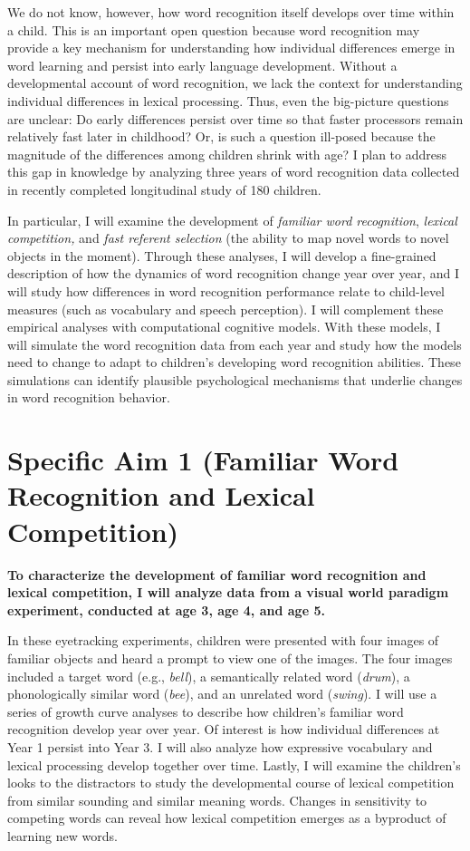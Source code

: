 \documentclass[]{book}
\theoremstyle{definition}
\theoremstyle{definition}
\theoremstyle{remark}
\begin{document}
We do not know, however, how word recognition itself develops over time
within a child. This is an important open question because word
recognition may provide a key mechanism for understanding how individual
differences emerge in word learning and persist into early language
development. Without a developmental account of word recognition, we
lack the context for understanding individual differences in lexical
processing. Thus, even the big-picture questions are unclear: Do early
differences persist over time so that faster processors remain
relatively fast later in childhood? Or, is such a question ill-posed
because the magnitude of the differences among children shrink with age?
I plan to address this gap in knowledge by analyzing three years of word
recognition data collected in recently completed longitudinal study of
180 children.

In particular, I will examine the development of \emph{familiar word
recognition}, \emph{lexical competition,} and \emph{fast referent
selection} (the ability to map novel words to novel objects in the
moment). Through these analyses, I will develop a fine-grained
description of how the dynamics of word recognition change year over
year, and I will study how differences in word recognition performance
relate to child-level measures (such as vocabulary and speech
perception). I will complement these empirical analyses with
computational cognitive models. With these models, I will simulate the
word recognition data from each year and study how the models need to
change to adapt to children's developing word recognition abilities.
These simulations can identify plausible psychological mechanisms that
underlie changes in word recognition behavior.

\section{Specific Aim 1 (Familiar Word Recognition and Lexical
Competition)}\label{specific-aim-1-familiar-word-recognition-and-lexical-competition}

\textbf{To characterize the development of familiar word recognition and
lexical competition, I will analyze data from a visual world paradigm
experiment, conducted at age 3, age 4, and age 5.}

In these eyetracking experiments, children were presented with four
images of familiar objects and heard a prompt to view one of the images.
The four images included a target word (e.g., \emph{bell}), a
semantically related word (\emph{drum}), a phonologically similar word
(\emph{bee}), and an unrelated word (\emph{swing}). I will use a series
of growth curve analyses to describe how children's familiar word
recognition develop year over year. Of interest is how individual
differences at Year 1 persist into Year 3. I will also analyze how
expressive vocabulary and lexical processing develop together over time.
Lastly, I will examine the children's looks to the distractors to study
the developmental course of lexical competition from similar sounding
and similar meaning words. Changes in sensitivity to competing words can
reveal how lexical competition emerges as a byproduct of learning new
words.
\end{document}
